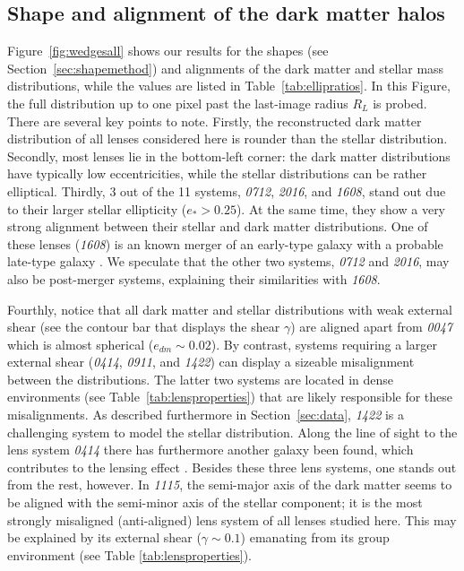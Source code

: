 \documentclass[useAMS,usenatbib]{mn2e}
\begin{document}
\subsection{Shape and alignment of the dark matter halos}
Figure~\ref{fig:wedgesall} shows our results for the shapes (see Section~\ref{sec:shapemethod}) and alignments of the dark matter and stellar mass distributions, while the values are listed in Table~\ref{tab:ellipratios}. In this Figure, the full distribution up to one pixel past the last-image radius $R_{L}$ is probed. There are several key points to note. Firstly, the reconstructed dark matter distribution of all lenses considered here is rounder than the stellar distribution. Secondly, most lenses lie in the bottom-left corner: the dark matter distributions have typically low eccentricities, while the stellar distributions can be rather elliptical. Thirdly, 3 out of the 11 systems, {\it0712}, {\it2016}, and {\it1608}, stand out due to their larger stellar ellipticity ($e_* > 0.25$). At the same time, they show a very strong alignment between their stellar and dark matter distributions. One of these lenses ({\it1608}) is an known merger of an early-type galaxy with a probable late-type galaxy \citep{2003ApJ...584..100S}. We speculate that the other two systems, {\it0712} and {\it2016}, may also be post-merger systems, explaining their similarities with {\it1608}.

Fourthly, notice that all dark matter and stellar distributions with weak external shear (see the contour bar that displays the shear $\gamma$) are aligned apart from {\it0047} which is almost spherical ($e_{dm}\sim0.02$). By contrast, systems requiring a larger external shear ({\it0414}, {\it0911}, and {\it1422}) can display a sizeable misalignment between the distributions. The latter two systems are located in dense environments (see Table~\ref{tab:lensproperties}) that are likely responsible for these misalignments. As described furthermore in Section~\ref{sec:data}, {\it1422} is a challenging system to model the stellar distribution. Along the line of sight to the lens system {\it0414} there has furthermore another galaxy been found, which contributes to the lensing effect \citep{2011MNRAS.413L..86C}. Besides these three lens systems, one stands out from the rest, however. In {\it1115}, the semi-major axis of the dark matter seems to be aligned with the semi-minor axis of the stellar component; it is the most strongly misaligned (anti-aligned) lens system of all lenses studied here. This may be explained by its external shear ($\gamma \sim 0.1$) emanating from its group environment (see Table \ref{tab:lensproperties}).
\end{document}
